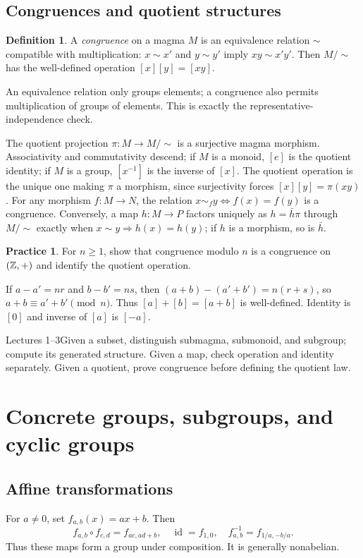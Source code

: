 \documentclass[11pt,openany]{book}
\newcommand{\id}{\operatorname{id}}\newcommand{\Sym}{\operatorname{Sym}}
\theoremstyle{definition}
\newtheorem{definition}[theorem]{Definition}
\newtheorem{exercise}[theorem]{Practice}
\begin{document}
\section{Congruences and quotient structures}
\begin{definition}A \emph{congruence} on a magma $M$ is an equivalence relation $\sim$ compatible with multiplication: $x\sim x'$ and $y\sim y'$ imply $xy\sim x'y'$. Then $M/{\sim}$ has the well-defined operation $[x][y]=[xy]$.\end{definition}
\begin{intuition}An equivalence relation only groups elements; a congruence also permits multiplication of groups of elements. This is exactly the representative-independence check.\end{intuition}
The quotient projection $\pi:M\to M/{\sim}$ is a surjective magma morphism. Associativity and commutativity descend; if $M$ is a monoid, $[e]$ is the quotient identity; if $M$ is a group, $[x^{-1}]$ is the inverse of $[x]$. The quotient operation is the unique one making $\pi$ a morphism, since surjectivity forces $[x][y]=\pi(xy)$.
For any morphism $f:M\to N$, the relation $x\sim_f y\iff f(x)=f(y)$ is a congruence. Conversely, a map $h:M\to P$ factors uniquely as $h=\bar h\pi$ through $M/{\sim}$ exactly when $x\sim y\Rightarrow h(x)=h(y)$; if $h$ is a morphism, so is $\bar h$.
\begin{exercise}For $n\ge1$, show that congruence modulo $n$ is a congruence on $(\mathbb Z,+)$ and identify the quotient operation.\end{exercise}
\begin{solution}If $a-a'=nr$ and $b-b'=ns$, then $(a+b)-(a'+b')=n(r+s)$, so $a+b\equiv a'+b'\pmod n$. Thus $[a]+[b]=[a+b]$ is well-defined. Identity is $[0]$ and inverse of $[a]$ is $[-a]$.\end{solution}
\begin{checkpoint}{Lectures 1--3}Given a subset, distinguish submagma, submonoid, and subgroup; compute its generated structure. Given a map, check operation and identity separately. Given a quotient, prove congruence before defining the quotient law.\end{checkpoint}


\chapter{Concrete groups, subgroups, and cyclic groups}
\section{Affine transformations}
For $a\ne0$, set $f_{a,b}(x)=ax+b$. Then
\[
f_{a,b}\circ f_{c,d}=f_{ac,ad+b},\quad \id=f_{1,0},\quad f_{a,b}^{-1}=f_{1/a,-b/a}.
\]
Thus these maps form a group under composition. It is generally nonabelian.
\end{document}
